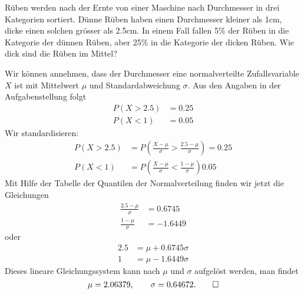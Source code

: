 Rüben werden nach der Ernte von einer Maschine nach Durchmesser
in drei Kategorien sortiert. Dünne Rüben haben einen Durchmesser
kleiner als 1cm, dicke einen solchen grösser als 2.5cm. In einem
Fall fallen 5\% der Rüben in die Kategorie der dünnen Rüben,
aber 25\% in die Kategorie der dicken Rüben. Wie dick sind
die Rüben im Mittel?

\begin{loesung}
Wir können annehmen, dass der Durchmesser eine normalverteilte
Zufallsvariable $X$ ist
mit Mittelwert $\mu$ und Standardabweichung $\sigma$. Aus den
Angaben in der Aufgabenstellung folgt
\begin{align*}
P(X>2.5)&= 0.25\\
P(X<1)&= 0.05
\end{align*}
Wir standardisieren:
\begin{align*}
P(X>2.5)&=P\left(
\frac{X-\mu}{\sigma}>\frac{2.5-\mu}{\sigma}
\right)=0.25
\\
P(X<1)&=P\left(
\frac{X-\mu}{\sigma}<\frac{1-\mu}{\sigma}
\right)0.05
\end{align*}
Mit Hilfe der Tabelle der Quantilen der Normalverteilung finden
wir jetzt die Gleichungen
\begin{align*}
\frac{2.5-\mu}{\sigma}&=0.6745
\\
\frac{1-\mu}{\sigma}&=-1.6449
\end{align*}
oder
\begin{align*}
2.5&=\mu+0.6745\sigma\\
1&=\mu-1.6449\sigma
\end{align*}
Dieses lineare Gleichungssystem kann nach $\mu$ und $\sigma$ aufgelöst
werden, man findet
\[
\mu=2.06379,\qquad
\sigma=0.64672.
\qedhere
\]
\end{loesung}

